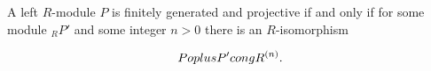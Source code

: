 A left $R$-module $P$ is finitely generated and projective if and only if for some module ${}_R P'$ and some integer $n > 0$ there is an $R$-isomorphism

$$P \\oplus P' \\cong R^{(n)}.$$
